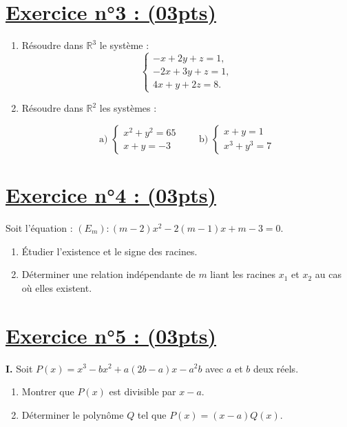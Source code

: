 \documentclass[12pt,a4paper]{article}
\begin{document}
\section*{\underline{Exercice n°3 : (03pts)}}

\begin{enumerate}

\item Résoudre dans \( \mathbb{R}^3 \) le système :
\[
\begin{cases}
-x + 2y + z = 1, \\
-2x + 3y + z = 1, \\
4x + y + 2z = 8.
\end{cases}
\]

\item Résoudre dans \( \mathbb{R}^2 \) les systèmes :

\[
\text{a) }
\begin{cases}
x^2 + y^2 = 65 \\
x + y = -3
\end{cases}
\quad
\quad
\text{b) }
\begin{cases}
x + y = 1 \\
x^3 + y^3 = 7
\end{cases}
\]
\end{enumerate}
\section*{\underline{Exercice n°4 : (03pts)}}
Soit l'équation : $(E_m) : (m-2)x^2 - 2(m-1)x + m - 3 = 0.$
\begin{enumerate}
    \item Étudier l'existence et le signe des racines.
    \item Déterminer une relation indépendante de $m$ liant les racines $x_1$ et $x_2$ au cas où elles existent.
\end{enumerate}

\section*{\underline{Exercice n°5 : (03pts)}}

\bigskip

\textbf{I.} Soit \( P(x) = x^3 - bx^2 + a(2b - a)x - a^2b \) avec \( a \) et \( b \) deux réels.

\begin{enumerate}
    \item Montrer que \( P(x) \) est divisible par \( x - a \).
    \item Déterminer le polynôme \( Q \) tel que \( P(x) = (x - a)Q(x) \).
\end{enumerate}
\end{document}
